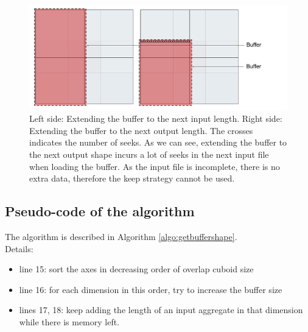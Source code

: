 \documentclass[conference]{IEEEtran}
\begin{document}
\begin{figure}[h]
\centering
\includegraphics[scale=0.20]{./figures/extendingbuffers.png}
\caption{ Left side: Extending the buffer to the next input length. Right side: Extending the buffer to the next output length. The crosses indicates the number of seeks. As we can see, extending the buffer to the next output shape incurs a lot of seeks in the next input file when loading the buffer. As the input file is incomplete, there is no extra data, therefore the keep strategy cannot be used.
}
\label{fig:extendingbuffers}
\end{figure}

\subsection{Pseudo-code of the algorithm}
The algorithm is described in Algorithm \ref{algo:getbuffershape}. \\

Details:
\begin{itemize}
  \item line 15: sort the axes in decreasing order of overlap cuboid size
  \item line 16: for each dimension in this order, try to increase the buffer size
  \item lines 17, 18: keep adding the length of an input aggregate in that dimension while there is memory left.
\end{itemize}
\end{document}
